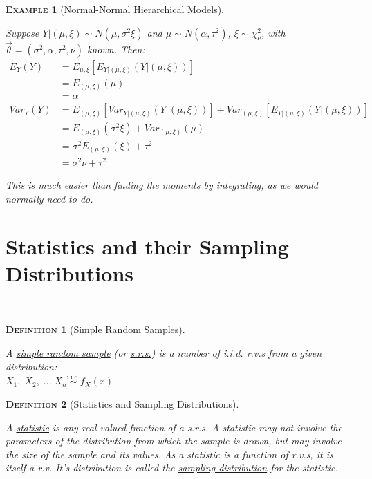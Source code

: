 \documentclass[12pt,a4paper]{article}
\newtheorem{definition}{\textsc{Definition}}[section]
\newtheorem{example}{\textsc{Example}}[section]
\begin{document}
\begin{example}[Normal-Normal Hierarchical Models]$\quad$\par\vspace{1cm}

Suppose $Y|(\mu,\xi) \sim N(\mu,\sigma^2\xi)$ and $\mu \sim N(\alpha,\tau^2)$, $\xi \sim \chi^2_\nu$, with $\vec{\theta} = (\sigma^2, \alpha, \tau^2, \nu)$ known. Then:
\begin{align*}
E_Y(Y) &= E_{\mu,\xi}[E_{Y|(\mu,\xi)}(Y|(\mu,\xi))]\\
&= E_{(\mu,\xi)}(\mu)\\
&= \alpha\\
Var_Y(Y) &= E_{(\mu,\xi)}[Var_{Y|(\mu,\xi)}(Y|(\mu,\xi))] + Var_{(\mu,\xi)}[E_{Y|(\mu,\xi)}(Y|(\mu,\xi))]\\
&= E_{(\mu,\xi)}(\sigma^2\xi) + Var_{(\mu,\xi)}(\mu)\\
&= \sigma^2E_{(\mu,\xi)}(\xi) + \tau^2\\
&= \sigma^2\nu + \tau^2
\end{align*}

This is much easier than finding the moments by integrating, as we would normally need to do.

\end{example}

\clearpage
\section{Statistics and their Sampling Distributions}$\;$

\begin{definition}[Simple Random Samples]$\;$\par\vspace{1cm}

A \underline{simple random sample} (or \underline{s.r.s.}) is a number of i.i.d. r.v.s from a given distribution:\\ $X_1,\;X_2,\; ...\; X_n \overset{\text{i.i.d.}}{\sim} f_X(x)$.
\end{definition}

\begin{definition}[Statistics and Sampling Distributions]$\;$\par\vspace{1cm}

A \underline{statistic} is any real-valued function of a s.r.s. A statistic may not involve the parameters of the distribution from which the sample is drawn, but may involve the size of the sample and its values. As a statistic is a function of r.v.s, it is itself a r.v. It's distribution is called the \underline{sampling distribution} for the statistic.

\end{definition}
\end{document}

